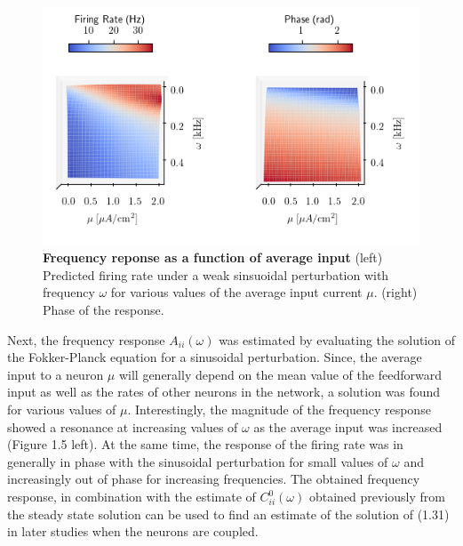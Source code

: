 \documentclass{ucetd}
\begin{document}
\begin{figure}[t!]
\centering
\includegraphics[width=150mm]{figure-4}
\caption{\textbf{Frequency reponse as a function of average input} (left) Predicted firing rate under a weak sinsuoidal perturbation with frequency $\omega$ for various values of the average input current $\mu$. (right) Phase of the response. }
\end{figure}


Next, the frequency response $A_{ii}(\omega)$ was estimated by evaluating the solution of the Fokker-Planck equation for a sinusoidal perturbation. Since, the average input to a neuron $\mu$ will generally depend on the mean value of the feedforward input as well as the rates of other neurons in the network, a solution was found for various values of $\mu$. Interestingly, the magnitude of the frequency response showed a resonance at increasing values of $\omega$ as the average input was increased (Figure 1.5 left). At the same time, the response of the firing rate was in generally in phase with the sinusoidal perturbation for small values of $\omega$ and increasingly out of phase for increasing frequencies. The obtained frequency response, in combination with the estimate of $C_{ii}^{0}(\omega)$ obtained previously from the steady state solution can be used to find an estimate of the solution of (1.31) in later studies when the neurons are coupled.
\end{document}
